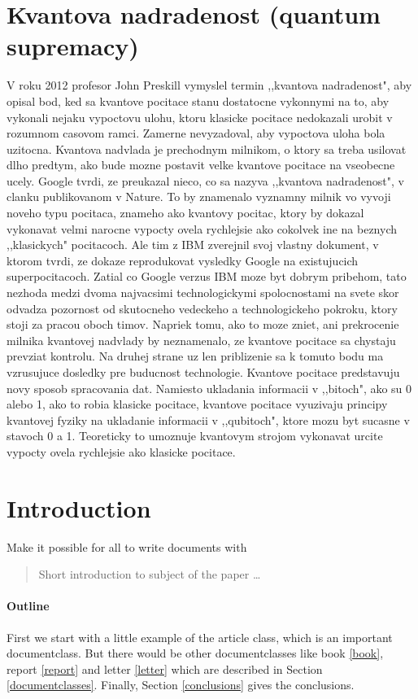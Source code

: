 \documentclass{article}
\begin{document}
\section{Kvantova nadradenost (quantum supremacy)}
V roku 2012 profesor John Preskill vymyslel termin ,,kvantova nadradenost", aby opisal bod, ked sa kvantove pocitace stanu dostatocne vykonnymi na to, aby vykonali nejaku vypoctovu ulohu, ktoru klasicke pocitace nedokazali urobit v rozumnom casovom ramci. Zamerne nevyzadoval, aby vypoctova uloha bola uzitocna. Kvantova nadvlada je prechodnym milnikom, o ktory sa treba usilovat dlho predtym, ako bude mozne postavit velke kvantove pocitace na vseobecne ucely.
\bigbreak
Google tvrdi, ze preukazal nieco, co sa nazyva ,,kvantova nadradenost", v clanku publikovanom v Nature. To by znamenalo vyznamny milnik vo vyvoji noveho typu pocitaca, znameho ako kvantovy pocitac, ktory by dokazal vykonavat velmi narocne vypocty ovela rychlejsie ako cokolvek ine na beznych ,,klasickych" pocitacoch. Ale tim z IBM zverejnil svoj vlastny dokument, v ktorom tvrdi, ze dokaze reprodukovat vysledky Google na existujucich superpocitacoch.
\bigbreak
Zatial co Google verzus IBM moze byt dobrym pribehom, tato nezhoda medzi dvoma najvacsimi technologickymi spolocnostami na svete skor odvadza pozornost od skutocneho vedeckeho a technologickeho pokroku, ktory stoji za pracou oboch timov. Napriek tomu, ako to moze zniet, ani prekrocenie milnika kvantovej nadvlady by neznamenalo, ze kvantove pocitace sa chystaju prevziat kontrolu. Na druhej strane uz len priblizenie sa k tomuto bodu ma vzrusujuce dosledky pre buducnost technologie.
\bigbreak
Kvantove pocitace predstavuju novy sposob spracovania dat. Namiesto ukladania informacii v ,,bitoch", ako su 0 alebo 1, ako to robia klasicke pocitace, kvantove pocitace vyuzivaju principy kvantovej fyziky na ukladanie informacii v ,,qubitoch", ktore mozu byt sucasne v stavoch 0 a 1. Teoreticky to umoznuje kvantovym strojom vykonavat urcite vypocty ovela rychlejsie ako klasicke pocitace.
\bigbreak

\section{Introduction}
Make it possible for all to write documents with

\begin{abstract}
Short introduction to subject of the paper \ldots
\end{abstract}

\paragraph{Outline}
First we start with a little example of the article class, which is an
important documentclass. But there would be other documentclasses like
book \ref{book}, report \ref{report} and letter \ref{letter} which are
described in Section \ref{documentclasses}. Finally, Section
\ref{conclusions} gives the conclusions.
\end{document}
